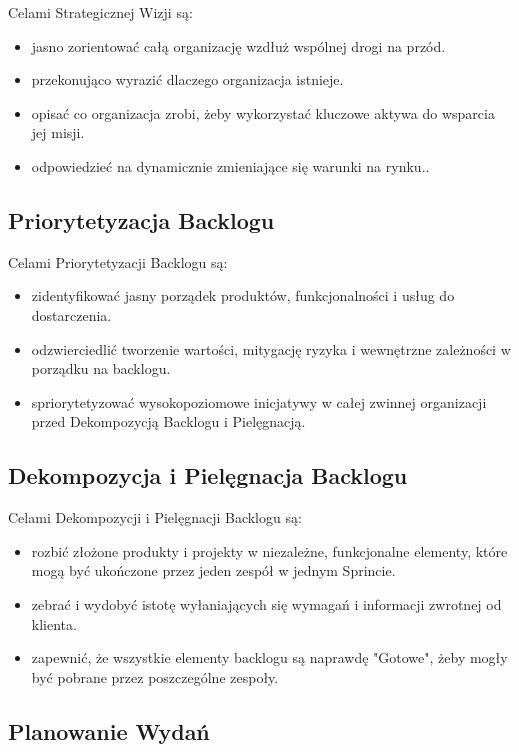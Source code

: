 \documentclass[12pt,a4paper,parskip=full]{scrartcl}
\begin{document}
Celami Strategicznej Wizji są:

\begin{itemize}
	\item jasno zorientować całą organizację wzdłuż wspólnej drogi na przód.
	\item przekonująco wyrazić dlaczego organizacja istnieje.
	\item opisać co organizacja zrobi, żeby wykorzystać kluczowe aktywa do wsparcia jej misji.
	\item odpowiedzieć na dynamicznie zmieniające się warunki na rynku..
\end{itemize}

\subsection{Priorytetyzacja Backlogu}

Celami Priorytetyzacji Backlogu są:

\begin{itemize}
	\item zidentyfikować jasny porządek produktów, funkcjonalności i usług do dostarczenia.
	\item odzwierciedlić tworzenie wartości, mitygację ryzyka i wewnętrzne zależności w porządku na backlogu.
	\item spriorytetyzować wysokopoziomowe inicjatywy w całej zwinnej organizacji przed Dekompozycją Backlogu i Pielęgnacją.
\end{itemize}

\subsection{Dekompozycja i Pielęgnacja Backlogu}

Celami Dekompozycji i Pielęgnacji Backlogu są:

\begin{itemize}
	\item rozbić złożone produkty i projekty w niezależne, funkcjonalne elementy, które mogą być ukończone przez jeden zespół w jednym Sprincie.
	\item zebrać i wydobyć istotę wyłaniających się wymagań i informacji zwrotnej od klienta.
	\item zapewnić, że wszystkie elementy backlogu są naprawdę "Gotowe", żeby mogły być pobrane przez poszczególne zespoły.
\end{itemize}

\subsection{Planowanie Wydań}
\end{document}
